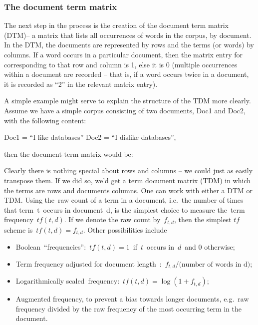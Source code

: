 \documentclass[11pt]{article}
\providecommand{\tightlist}{%
      \setlength{\itemsep}{0pt}\setlength{\parskip}{0pt}}
\begin{document}
    \hypertarget{the-document-term-matrix}{%
\subsubsection{The document term
matrix}\label{the-document-term-matrix}}

    The next step in the process is the creation of the document term matrix
(DTM)-- a matrix that lists all occurrences of words in the corpus, by
document. In the DTM, the documents are represented by rows and the
terms (or words) by columns. If a word occurs in a particular document,
then the matrix entry for corresponding to that row and column is 1,
else it is 0 (multiple occurrences within a document are recorded --
that is, if a word occurs twice in a document, it is recorded as ``2''
in the relevant matrix entry).

A simple example might serve to explain the structure of the TDM more
clearly. Assume we have a simple corpus consisting of two documents,
Doc1 and Doc2, with the following content:

Doc1 = ``I like databases'' Doc2 = ``I dislike databases'',

then the document-term matrix would be:

Clearly there is nothing special about rows and columns -- we could just
as easily transpose them. If we did so, we'd get a term document matrix
(TDM) in which the terms are rows and documents columns. One can work
with either a DTM or TDM. Using the~raw count of a term in a document,
i.e.~the number of times that term~t~occurs in document~d, is the
simplest choice to measure the~term frequency~\(tf(t,d)\). If we denote
the raw count by~\(f_{t,d}\), then the simplest \(tf\) scheme
is~\(tf(t,d) = f_{t,d}\). Other possibilities include

\begin{itemize}
\tightlist
\item
  Boolean~``frequencies'':~\(tf(t,d) = 1\)~if~\(t\)~occurs in~\(d\)~and
  \(0\) otherwise;
\item
  Term frequency adjusted for document
  length~:~\(f_{t,d} \big/ \text{(number of words in d)}\);
\item
  Logarithmically scaled~frequency:~\(tf(t,d) = \log (1 + f_{t,d})\);
\item
  Augmented frequency, to prevent a bias towards longer documents,
  e.g.~raw frequency divided by the raw frequency of the most occurring
  term in the document.
\end{itemize}
\end{document}
